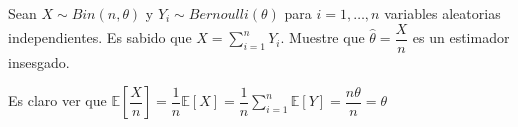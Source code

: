 \addpoints
\question[5] Sean $X\sim Bin(n,\theta)$ y $Y_i \sim Bernoulli(\theta)$ para $i=1,\dots,n$ variables aleatorias independientes. Es sabido que $X=\sum_{i=1}^{n} Y_i$. Muestre que $\hat{\theta}=\dfrac{X}{n}$ es un estimador insesgado. 

\begin{solution}
Es claro ver que $\mathbb{E}\left[\dfrac{X}{n}\right]=\dfrac{1}{n}\mathbb{E}\left[X\right]=\dfrac{1}{n}\displaystyle \sum_{i=1}^{n}\mathbb{E}[Y]=\dfrac{n\theta}{n}=\theta$
\end{solution}
